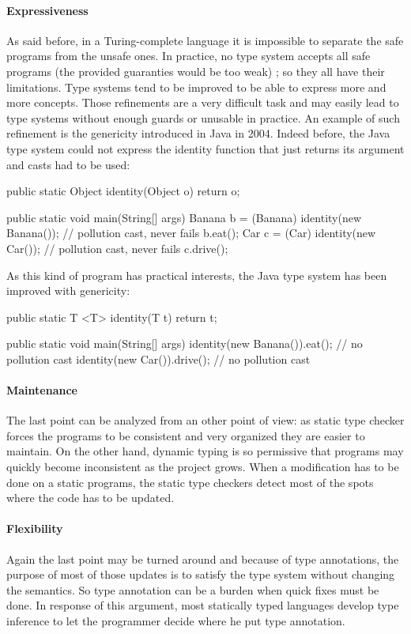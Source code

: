 \documentclass[a4paper]{report}
\begin{document}
\paragraph{Expressiveness} As said before, in a Turing-complete language it is impossible to separate the safe programs from the unsafe ones. In practice, no type system accepts all safe programs (the provided guaranties would be too weak) ; so they all have their limitations. Type systems tend to be improved to be able to express more and more concepts. Those refinements are a very difficult task and may easily lead to type systems without enough guards or unusable in practice. An example of such refinement is the genericity introduced in Java in 2004. Indeed before, the Java type system could not express the identity function that just returns its argument and casts had to be used:
\begin{java}
public static Object identity(Object o) {
	return o;
}

public static void main(String[] args) {
	Banana b = (Banana) identity(new Banana()); // pollution cast, never fails
	b.eat();
	Car c = (Car) identity(new Car());          // pollution cast, never fails
	c.drive();
}
\end{java}
As this kind of program has practical interests, the Java type system has been improved with genericity:
\begin{java}
public static T <T> identity(T t) {
   return t;
}

public static void main(String[] args) {
	identity(new Banana()).eat(); // no pollution cast
	identity(new Car()).drive();  // no pollution cast
}
\end{java}

\paragraph{Maintenance} The last point can be analyzed from an other point of view: as static type checker forces the programs to be consistent and very organized they are easier to maintain. On the other hand, dynamic typing is so permissive that programs may quickly become inconsistent as the project grows. When a modification has to be done on a static programs, the static type checkers detect most of the spots where the code has to be updated. 

\paragraph{Flexibility} Again the last point may be turned around and because of type annotations, the purpose of most of those updates is to satisfy the type system without changing the semantics. So type annotation can be a burden when quick fixes must be done. In response of this argument, most statically typed languages develop type inference to let the programmer decide where he put type annotation.
\end{document}
